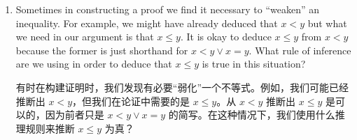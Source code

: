 \begin{enumerate}
  \workbookpagebreak
  
  \item Sometimes in constructing a proof we find it necessary to ``weaken'' an inequality.
  For example,
  we might have already deduced that $x < y$ but what we need in our argument is that $x \leq y$.
  It is
  okay to deduce $x \leq y$ from $x < y$ because the former is just shorthand for $x<y \lor x=y$.
  What
  rule of inference are we using in order to deduce that $x \leq y$ is true in this situation?
  
  有时在构建证明时，我们发现有必要“弱化”一个不等式。例如，我们可能已经推断出 $x < y$，但我们在论证中需要的是 $x \leq y$。从 $x < y$ 推断出 $x \leq y$ 是可以的，因为前者只是 $x<y \lor x=y$ 的简写。在这种情况下，我们使用什么推理规则来推断 $x \leq y$ 为真？
  
  \wbvfill
  
  \end{enumerate}